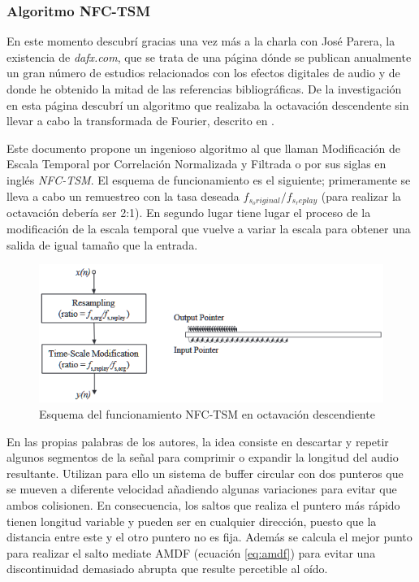 \subsubsection{Algoritmo NFC-TSM}
En este momento descubrí gracias una vez más a la charla con José Parera, la existencia de \emph{dafx.com}, que se trata de una página dónde se publican anualmente un gran número de estudios relacionados con los efectos digitales de audio y de donde he obtenido la mitad de las referencias bibliográficas. De la investigación en esta página descubrí un algoritmo que realizaba la octavación descendente sin llevar a cabo la transformada de Fourier, descrito en \cite{nfctsm}.

Este documento propone un ingenioso algoritmo al que llaman Modificación de Escala Temporal por Correlación Normalizada y Filtrada o por sus siglas en inglés \emph{NFC-TSM}. El esquema de funcionamiento es el siguiente; primeramente se lleva a cabo un remuestreo con la tasa deseada $f_{s_original}/f_{s_replay}$ (para realizar la octavación debería ser 2:1). En segundo lugar tiene lugar el proceso de la modificación de la escala temporal que vuelve a variar la escala para obtener una salida de igual tamaño que la entrada.

\begin{figure}[!ht]
\begin{center}
\includegraphics[width=12cm]{img/nfc-tsm.png}
\caption{\label{fig:tsm}Esquema del funcionamiento NFC-TSM en octavación descendiente}
\end{center}
\end{figure}

En las propias palabras de los autores, la idea consiste en descartar y repetir algunos segmentos de la señal para comprimir o expandir la longitud del audio resultante. Utilizan para ello un sistema de buffer circular con dos punteros que se mueven a diferente velocidad añadiendo algunas variaciones para evitar que ambos colisionen. En consecuencia, los saltos que realiza el puntero más rápido tienen longitud variable y pueden ser en cualquier dirección, puesto que la distancia entre este y el otro puntero no es fija. Además se calcula el mejor punto para realizar el salto mediate AMDF (ecuación \ref{eq:amdf}) para evitar una discontinuidad demasiado abrupta que resulte percetible al oído. 

